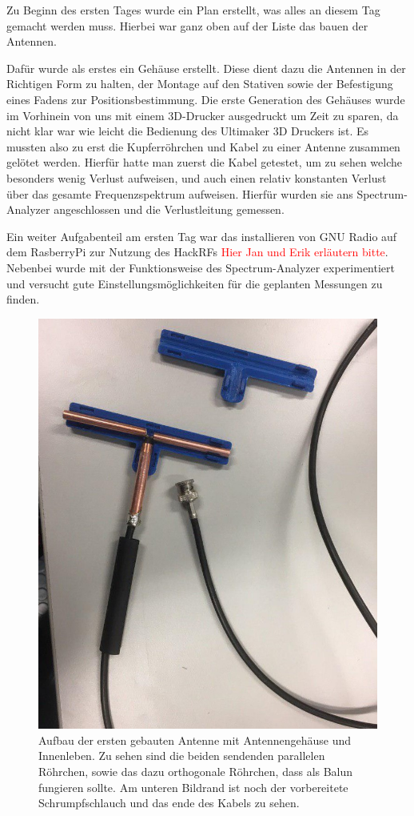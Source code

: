 \documentclass[titlepage,11pt,a4paper,ngerman]{article}
\begin{document}
Zu Beginn des ersten Tages wurde ein Plan erstellt, was alles an diesem Tag gemacht werden muss. Hierbei war ganz oben auf der Liste das bauen der Antennen.\par
Dafür wurde als erstes ein Gehäuse erstellt. Diese dient dazu die Antennen in der Richtigen Form zu halten, der Montage auf den Stativen sowie der Befestigung eines Fadens zur Positionsbestimmung. Die erste Generation des Gehäuses wurde im Vorhinein von uns mit einem 3D-Drucker ausgedruckt um Zeit zu sparen, da nicht klar war wie leicht die Bedienung des Ultimaker 3D Druckers ist. Es mussten also zu erst die Kupferröhrchen und Kabel zu einer Antenne zusammen gelötet werden. Hierfür hatte man zuerst die Kabel getestet, um zu sehen welche besonders wenig Verlust aufweisen, und auch einen relativ konstanten Verlust über das gesamte Frequenzspektrum aufweisen. Hierfür wurden sie ans Spectrum-Analyzer angeschlossen und die Verlustleitung gemessen.\par
Ein weiter Aufgabenteil am ersten Tag war das installieren von GNU Radio auf dem RasberryPi zur Nutzung des HackRFs \textcolor{red}{Hier Jan und Erik erläutern bitte}. Nebenbei wurde mit der Funktionsweise des Spectrum-Analyzer experimentiert und versucht gute Einstellungsmöglichkeiten für die geplanten Messungen zu finden.
\begin{figure}[ht]
	\centering
	\includegraphics[scale=0.35, trim={0cm 12cm 0cm 0cm}, clip]{Bilder/Ant_innen_1}
	\caption{Aufbau der ersten gebauten Antenne mit Antennengehäuse und Innenleben. Zu sehen sind die beiden sendenden parallelen Röhrchen, sowie das dazu orthogonale Röhrchen, dass als Balun fungieren sollte. Am unteren Bildrand ist noch der vorbereitete Schrumpfschlauch und das ende des Kabels zu sehen.}
	\label{Antenne1}
\end{figure}
\end{document}

